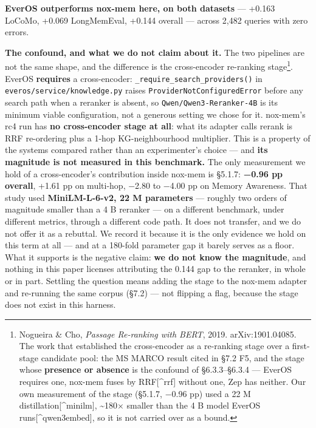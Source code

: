 \documentclass[
]{article}
\begin{document}
\textbf{EverOS outperforms nox-mem here, on both datasets} --- +0.163
LoCoMo, +0.069 LongMemEval, +0.144 overall --- across 2,482 queries with
zero errors.

\textbf{The confound, and what we do not claim about it.} The two
pipelines are not the same shape, and the difference is the
cross-encoder re-ranking stage\footnote{Nogueira \& Cho, \emph{Passage
  Re-ranking with BERT}, 2019. arXiv:1901.04085. The work that
  established the cross-encoder as a re-ranking stage over a first-stage
  candidate pool: the MS MARCO result cited in §7.2 F5, and the stage
  whose \textbf{presence or absence} is the confound of §6.3.3--§6.3.4
  --- EverOS requires one, nox-mem fuses by RRF{[}\^{}rrf{]} without
  one, Zep has neither. Our own measurement of the stage (§5.1.7, −0.96
  pp) used a 22 M distillation{[}\^{}minilm{]}, \textasciitilde180×
  smaller than the 4 B model EverOS runs{[}\^{}qwen3embed{]}, so it is
  not carried over as a bound.}. EverOS \textbf{requires} a
cross-encoder: \texttt{\_require\_search\_providers()} in
\texttt{everos/service/knowledge.py} raises
\texttt{ProviderNotConfiguredError} before any search path when a
reranker is absent, so \texttt{Qwen/Qwen3-Reranker-4B} is its minimum
viable configuration, not a generous setting we chose for it. nox-mem's
rc4 run has \textbf{no cross-encoder stage at all}: what its adapter
calls rerank is RRF re-ordering plus a 1-hop KG-neighbourhood
multiplier. This is a property of the systems compared rather than an
experimenter's choice --- and \textbf{its magnitude is not measured in
this benchmark.} The only measurement we hold of a cross-encoder's
contribution inside nox-mem is §5.1.7: \textbf{−0.96 pp overall}, +1.61
pp on multi-hop, −2.80 to −4.00 pp on Memory Awareness. That study used
\textbf{MiniLM-L-6-v2, 22 M parameters} --- roughly two orders of
magnitude smaller than a 4 B reranker --- on a different benchmark,
under different metrics, through a different code path. It does not
transfer, and we do not offer it as a rebuttal. We record it because it
is the only evidence we hold on this term at all --- and at a 180-fold
parameter gap it barely serves as a floor. What it supports is the
negative claim: \textbf{we do not know the magnitude}, and nothing in
this paper licenses attributing the 0.144 gap to the reranker, in whole
or in part. Settling the question means adding the stage to the nox-mem
adapter and re-running the same corpus (§7.2) --- not flipping a flag,
because the stage does not exist in this harness.
\end{document}
